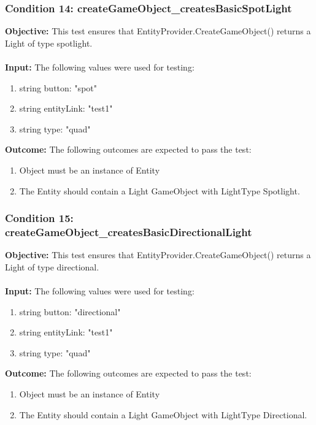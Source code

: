 \documentclass[a4paper,12pt]{article}
\begin{document}
		\subsubsection{Condition 14: createGameObject\_createsBasicSpotLight}
			\textbf{Objective:} This test ensures that EntityProvider.CreateGameObject() returns a Light of type spotlight.\\\\
			\textbf{Input:} The following values were used for testing:
				\begin{enumerate}
					\item string button: "spot"
					\item string entityLink: "test1"
					\item string type: "quad"
				\end{enumerate}
			\textbf{Outcome:} The following outcomes are expected to pass the test:
				\begin{enumerate}
					\item Object must be an instance of Entity
					\item The Entity should contain a Light GameObject with LightType Spotlight.
				\end{enumerate}
		\subsubsection{Condition 15: createGameObject\_createsBasicDirectionalLight}
			\textbf{Objective:} This test ensures that EntityProvider.CreateGameObject() returns a Light of type directional.\\\\
			\textbf{Input:} The following values were used for testing:
				\begin{enumerate}
					\item string button: "directional"
					\item string entityLink: "test1"
					\item string type: "quad"
				\end{enumerate}
			\textbf{Outcome:} The following outcomes are expected to pass the test:
				\begin{enumerate}
					\item Object must be an instance of Entity
					\item The Entity should contain a Light GameObject with LightType Directional.
				\end{enumerate}
\end{document}

